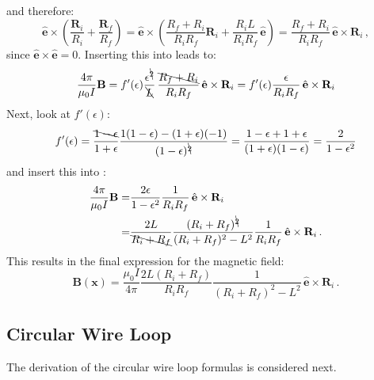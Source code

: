 and therefore:
\begin{equation}
   \hat{\mathbf{e}} \times \left( \frac{\mathbf{R}_i}{R_i} + \frac{\mathbf{R}_f}{R_f} \right)
 = \hat{\mathbf{e}} \times \left( \frac{R_f+R_i}{R_i R_f} \mathbf{R}_i + \frac{R_i L}{R_i R_f} \, \hat{\mathbf{e}} \right)
 = \frac{R_f+R_i}{R_i R_f} \, \hat{\mathbf{e}} \times \mathbf{R}_i \, ,
\end{equation}
since $\hat{\mathbf{e}} \times \hat{\mathbf{e}} = 0$.
Inserting this into  leads to:
\begin{equation}
   \frac{4 \pi}{\mu_0 I} \mathbf{B}
 = f'(\epsilon) \frac{\epsilon^{\bcancel{2}}}{\bcancel{L}} \, \frac{\bcancel{R_f+R_i}}{R_i R_f} \, \hat{\mathbf{e}} \times \mathbf{R}_i
 = f'(\epsilon) \frac{\epsilon}{R_i R_f} \, \hat{\mathbf{e}} \times \mathbf{R}_i \label{eqn:B_intermediate_2}
\end{equation}
Next, look at $f'(\epsilon)$:
\begin{equation}
   f'(\epsilon)
 = \frac{\bcancel{1 - \epsilon}}{1 + \epsilon} \frac{1 (1-\epsilon) - (1+\epsilon) (-1)}{(1 - \epsilon)^{\bcancel{2}}}
 = \frac{1 - \epsilon + 1 + \epsilon}{(1 + \epsilon)(1 - \epsilon)}
 = \frac{2}{1 - \epsilon^2}
\end{equation}
and insert this into :
\begin{align}
   \frac{4 \pi}{\mu_0 I} \mathbf{B}
 = & \frac{2 \epsilon}{1 - \epsilon^2} \frac{1}{R_i R_f} \, \hat{\mathbf{e}} \times \mathbf{R}_i \\
 = & \frac{2 L}{\bcancel{R_i + R_f}} \frac{(R_i + R_f)^{\bcancel{2}}}{(R_i + R_f)^2 - L^2} \frac{1}{R_i R_f} \, \hat{\mathbf{e}} \times \mathbf{R}_i \, .
\end{align}
This results in the final expression for the magnetic field:
\begin{equation}
 \mathbf{B} (\mathbf{x}) = \frac{\mu_0 I}{4 \pi} \frac{2 L (R_i + R_f)}{R_i R_f} \frac{1}{(R_i + R_f)^2 - L^2} \, \hat{\mathbf{e}} \times \mathbf{R}_i \, .
\end{equation}

\subsection{Circular Wire Loop}
The derivation of the circular wire loop formulas is considered next.

